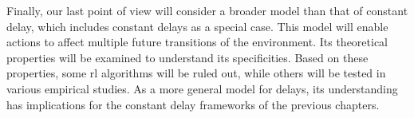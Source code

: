 Finally, our last point of view will consider a broader model than that of constant delay, which includes constant delays as a special case. 
This model will enable actions to affect multiple future transitions of the environment.
Its theoretical properties will be examined to understand its specificities.
Based on these properties, some \gls{rl} algorithms will be ruled out, while others will be tested in various empirical studies. 
As a more general model for delays, its understanding has implications for the constant delay frameworks of the previous chapters. 
